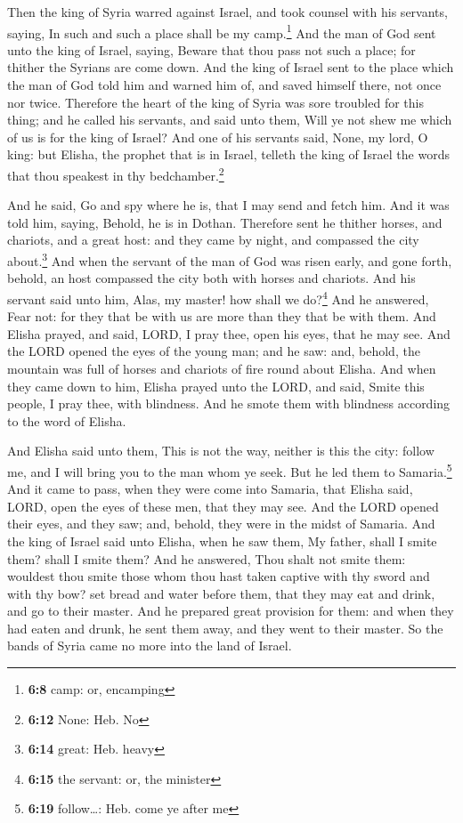  Then the king of Syria warred against Israel, and took
counsel with his servants, saying, In such and such a place shall be my
camp.\footnote{\textbf{6:8} camp: or, encamping}  And the
man of God sent unto the king of Israel, saying, Beware that thou pass
not such a place; for thither the Syrians are come down. 
And the king of Israel sent to the place which the man of God told him
and warned him of, and saved himself there, not once nor twice.
 Therefore the heart of the king of Syria was sore
troubled for this thing; and he called his servants, and said unto them,
Will ye not shew me which of us is for the king of Israel?
 And one of his servants said, None, my lord, O king: but
Elisha, the prophet that is in Israel, telleth the king of Israel the
words that thou speakest in thy bedchamber.\footnote{\textbf{6:12} None:
  Heb. No}

 And he said, Go and spy where he is, that I may send and
fetch him. And it was told him, saying, Behold, he is in Dothan.
 Therefore sent he thither horses, and chariots, and a
great host: and they came by night, and compassed the city
about.\footnote{\textbf{6:14} great: Heb. heavy}  And
when the servant of the man of God was risen early, and gone forth,
behold, an host compassed the city both with horses and chariots. And
his servant said unto him, Alas, my master! how shall we do?\footnote{\textbf{6:15}
  the servant: or, the minister}  And he answered, Fear
not: for they that be with us are more than they that be with them.
 And Elisha prayed, and said, LORD, I pray thee, open his
eyes, that he may see. And the LORD opened the eyes of the young man;
and he saw: and, behold, the mountain was full of horses and chariots of
fire round about Elisha.  And when they came down to him,
Elisha prayed unto the LORD, and said, Smite this people, I pray thee,
with blindness. And he smote them with blindness according to the word
of Elisha.

 And Elisha said unto them, This is not the way, neither
is this the city: follow me, and I will bring you to the man whom ye
seek. But he led them to Samaria.\footnote{\textbf{6:19} follow\ldots:
  Heb. come ye after me}  And it came to pass, when they
were come into Samaria, that Elisha said, LORD, open the eyes of these
men, that they may see. And the LORD opened their eyes, and they saw;
and, behold, they were in the midst of Samaria.  And the
king of Israel said unto Elisha, when he saw them, My father, shall I
smite them? shall I smite them?  And he answered, Thou
shalt not smite them: wouldest thou smite those whom thou hast taken
captive with thy sword and with thy bow? set bread and water before
them, that they may eat and drink, and go to their master.
 And he prepared great provision for them: and when they
had eaten and drunk, he sent them away, and they went to their master.
So the bands of Syria came no more into the land of Israel.


